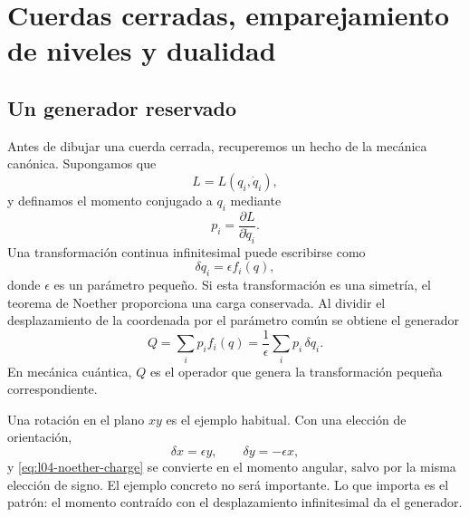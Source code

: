 \chapter{Cuerdas cerradas, emparejamiento de niveles y dualidad}


\section{Un generador reservado}

Antes de dibujar una cuerda cerrada, recuperemos un hecho de la mecánica canónica. Supongamos que
\begin{equation}
  L=L(q_i,\dot q_i),
\end{equation}
y definamos el momento conjugado a \(q_i\) mediante
\begin{equation}
  p_i=\frac{\partial L}{\partial\dot q_i}.
\end{equation}
Una transformación continua infinitesimal puede escribirse como
\begin{equation}
  \delta q_i=\epsilon f_i(q),
  \label{eq:l04-infinitesimal-transformation}
\end{equation}
donde \(\epsilon\) es un parámetro pequeño. Si esta transformación es una simetría, el teorema de Noether proporciona una carga conservada. Al dividir el desplazamiento de la coordenada por el parámetro común se obtiene el generador
\begin{equation}
  Q=\sum_i p_i f_i(q)
   =\frac{1}{\epsilon}\sum_i p_i\,\delta q_i.
  \label{eq:l04-noether-charge}
\end{equation}
En mecánica cuántica, \(Q\) es el operador que genera la transformación pequeña correspondiente.

Una rotación en el plano \(xy\) es el ejemplo habitual. Con una elección de orientación,
\begin{equation}
  \delta x=\epsilon y,
  \qquad
  \delta y=-\epsilon x,
\end{equation}
y \eqref{eq:l04-noether-charge} se convierte en el momento angular, salvo por la misma elección de signo. El ejemplo concreto no será importante. Lo que importa es el patrón: el momento contraído con el desplazamiento infinitesimal da el generador.

